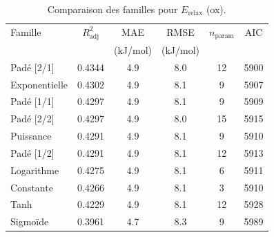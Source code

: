 \begin{table}[htbp]
\centering
\footnotesize
\caption{Comparaison des familles pour $E_{\mathrm{relax}}$ (ox).}
\label{tab:s4_erelax_ox_families}
\begin{tabular}{lccccc}
\toprule
Famille & $R^2_{\mathrm{adj}}$ & MAE & RMSE & $n_{\mathrm{param}}$ & AIC \\
 & & (kJ/mol) & (kJ/mol) & & \\
\midrule
Padé [2/1] & 0.4344 & 4.9 & 8.0 & 12 & 5900 \\
Exponentielle & 0.4302 & 4.9 & 8.1 & 9 & 5907 \\
Padé [1/1] & 0.4297 & 4.9 & 8.1 & 9 & 5909 \\
Padé [2/2] & 0.4297 & 4.9 & 8.0 & 15 & 5915 \\
Puissance & 0.4291 & 4.9 & 8.1 & 9 & 5910 \\
Padé [1/2] & 0.4291 & 4.9 & 8.1 & 12 & 5913 \\
Logarithme & 0.4275 & 4.9 & 8.1 & 6 & 5911 \\
Constante & 0.4266 & 4.9 & 8.1 & 3 & 5910 \\
Tanh & 0.4229 & 4.9 & 8.1 & 12 & 5928 \\
Sigmoïde & 0.3961 & 4.7 & 8.3 & 9 & 5989 \\
\bottomrule
\end{tabular}
\end{table}